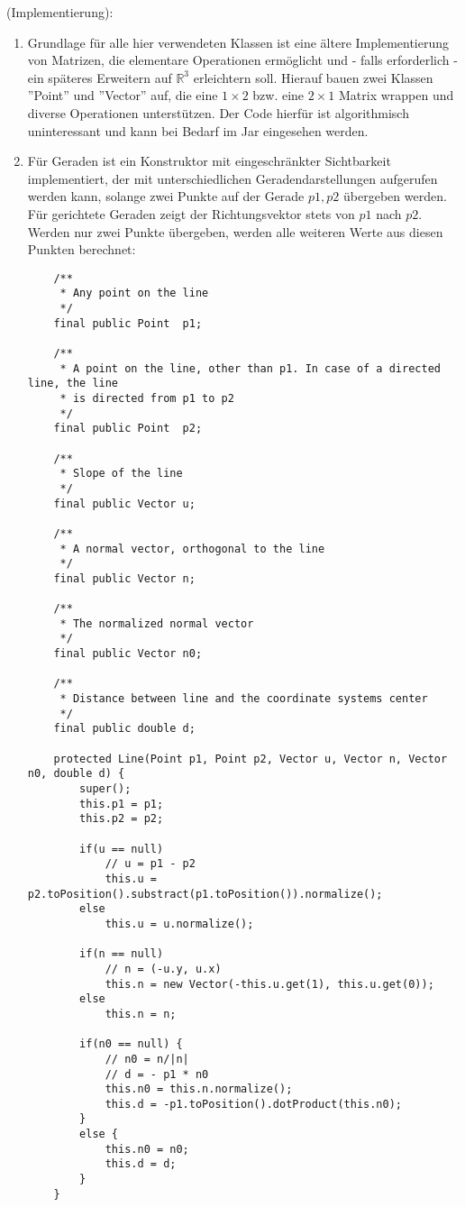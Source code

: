 \documentclass[a4paper, titlepage=false, parskip=full-, 10pt]{scrartcl}
\newcounter{tasknbr}
\newenvironment{task}[1]{{\bf Aufgabe \arabic {tasknbr}\stepcounter{tasknbr}} (#1):\begin{enumerate}}{\end{enumerate}}
\newcommand{\subtask}[1]{\item[#1)]}
\begin{document}
\begin{task}{Implementierung}
\item[]
Grundlage für alle hier verwendeten Klassen ist eine ältere Implementierung von Matrizen, die elementare Operationen ermöglicht und - falls erforderlich - ein späteres Erweitern auf $\mathbb{R}^3$ erleichtern soll. Hierauf bauen zwei Klassen ''Point'' und ''Vector'' auf, die eine $1\times 2$ bzw. eine $2\times 1$ Matrix wrappen und diverse Operationen unterstützen. Der Code hierfür ist algorithmisch uninteressant und kann bei Bedarf im Jar eingesehen werden.

\subtask{a}
Für Geraden ist ein Konstruktor mit eingeschränkter Sichtbarkeit implementiert, der mit unterschiedlichen Geradendarstellungen aufgerufen werden kann, solange zwei Punkte auf der Gerade $p1,p2$ übergeben werden. Für gerichtete Geraden zeigt der Richtungsvektor stets von $p1$ nach $p2$. Werden nur zwei Punkte übergeben, werden alle weiteren Werte aus diesen Punkten berechnet:
\lstset{language=Java}
\begin{lstlisting}
    /**
     * Any point on the line
     */
    final public Point  p1;

    /**
     * A point on the line, other than p1. In case of a directed line, the line
     * is directed from p1 to p2
     */
    final public Point  p2;

    /**
     * Slope of the line
     */
    final public Vector u;

    /**
     * A normal vector, orthogonal to the line
     */
    final public Vector n;

    /**
     * The normalized normal vector
     */
    final public Vector n0;

    /**
     * Distance between line and the coordinate systems center
     */
    final public double d;

    protected Line(Point p1, Point p2, Vector u, Vector n, Vector n0, double d) {
        super();
        this.p1 = p1;
        this.p2 = p2;

        if(u == null)
            // u = p1 - p2
            this.u = p2.toPosition().substract(p1.toPosition()).normalize();
        else
            this.u = u.normalize();

        if(n == null)
            // n = (-u.y, u.x)
            this.n = new Vector(-this.u.get(1), this.u.get(0));
        else
            this.n = n;

        if(n0 == null) {
            // n0 = n/|n|
            // d = - p1 * n0
            this.n0 = this.n.normalize();
            this.d = -p1.toPosition().dotProduct(this.n0);
        }
        else {
            this.n0 = n0;
            this.d = d;
        }
    }
\end{lstlisting}


\end{task}
\end{document}
